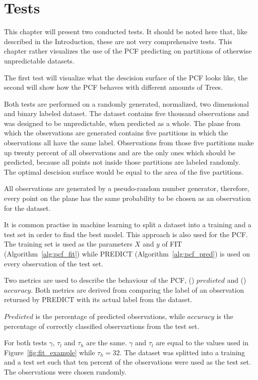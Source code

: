 \section{Tests}
\label{sec:tests}

This chapter will present two conducted tests. It should
be noted here that, like described in the Introduction,
these are not very comprehensive tests. This chapter rather
visualizes the use of the PCF predicting on partitions of
otherwise unpredictable datasets.

The first test will visualize what the descision surface of
the PCF looks like, the second will show how the PCF
behaves with different amounts of Trees.

Both tests are performed on a randomly generated,
normalized, two dimensional and binary labeled dataset. The
dataset contains five thousand observations and was
designed to be unpredictable, when predicted as a whole.
The plane from which the observations are generated
contains five partitions in which the observations all have
the same label. Observations from those five partitions
make up twenty percent of all observations and are the only
ones which should be predicted, because all points not
inside those partitions are labeled randomly. The optimal
descision surface would be equal to the area of the five
partitions.

All observations are generated by a pseudo-random number
generator, therefore, every point on the plane has the same
probability to be chosen as an observation for the dataset.

It is common practise in machine learning to split a
dataset into a training and a test set in order to find
the best model.\cite[chapter 18]{ki} This approach is also
used for the PCF. The training set is used as the
parameters $X$ and $y$ of FIT (Algorithm~\ref{alg:pcf_fit})
while PREDICT (Algorithm~\ref{alg:pcf_pred}) is used on
every observation of the test set.

Two metrics are used to describe the behaviour of the PCF,
() $predicted$ and ()
$accuracy$. Both metrics are derived from comparing the
label of an observation returned by PREDICT with its actual
label from the dataset.

$Predicted$ is the percentage of predicted observations,
while $accuracy$ is the percentage of correctly classified
observartions from the test set.

For both tests $\gamma$, $\tau_l$ and $\tau_h$ are the
same. $\gamma$ and $\tau_l$ are equal to the values used in
Figure~\ref{fig:fit_example} while $\tau_h = 32$. The
dataset was splitted into a training and a test set such
that ten percent of the observations were used as the test
set. The observations were chosen randomly.

